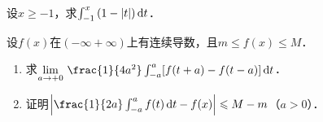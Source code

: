 \documentclass[plain,noanswer,medmath]{../../template/jnuexam}
\begin{document}




\begin{problem}
设$x\ge -1$，求$\int_{-1}^x \left(1-|t| \right)\mathop{}\!\mathrm{d} t$．
\end{problem}



\begin{problem}
设$f(x)$在$(-\infty +\infty)$上有连续导数，且$m\le f(x)\le M$．
\begin{enumerate}
\item 求$\lim_{a\to +0}\,\frac{1}{4a^2}\int_{-a}^a [f(t+a)-f(t-a)]\dt$．
\item 证明$\left| \frac{1}{2a}\int_{-a}^a f(t)\dt-f(x) \right|\le M-m$（$a>0$）．
\end{enumerate}
\end{problem}
\end{document}
